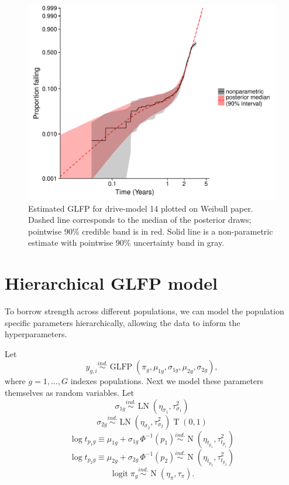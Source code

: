 \documentclass[12pt]{article}
\newcommand{\ind}{\stackrel{ind.}{\sim}}
\newcommand{\op}{\operatorname}
\begin{document}
\begin{figure}[H]
\centering
  \includegraphics[width=.8\textwidth]{mod14_example1.pdf}
  \caption{Estimated GLFP for drive-model 14 plotted on Weibull paper.  Dashed line corresponds to the median of the posterior draws; pointwise 90\% credible band is in red.  Solid line is a non-parametric estimate with pointwise 90\% uncertainty band in gray.}
  \label{fig1}
\end{figure}


\section{Hierarchical GLFP model}
\label{sec:Hierarchical GLFP model}

To borrow strength across different populations, we can model the population specific parameters hierarchically, allowing the data to inform the hyperparameters.

Let
\begin{equation}
y_{g,i} \ind \op{GLFP}\left( \pi_g, \mu_{1g}, \sigma_{1g}, \mu_{2g}, \sigma_{2g} \right),
\end{equation}
where $g=1,\ldots,G$ indexes populations. Next we model these parameters themselves as random variables. Let
\begin{equation*}
\sigma_{1g} \ind \op{LN} \left( \eta_{\sigma_1}, \tau^2_{\sigma_1} \right)
\end{equation*}
\begin{equation*}
\sigma_{2g} \ind \op{LN} \left( \eta_{\sigma_2}, \tau^2_{\sigma_2}\right)\op{T}\left(0, 1\right)
\end{equation*}
\begin{equation}
\label{eq:hier-model}
\log t_{p_{1}g} \equiv \mu_{1g} + \sigma_{1g}\,\Phi^{-1}(p_1)  \ind \op{N} \left(\eta_{t_{p_1}}, \tau^2_{t_{p_1}}\right)
\end{equation}
\begin{equation*}
\log t_{p_{2}g} \equiv \mu_{2g} + \sigma_{2g}\,\Phi^{-1}(p_2)  \ind \op{N} \left(\eta_{t_{p_2}}, \tau^2_{t_{p_2}}\right)
\end{equation*}
\begin{equation*}
\op{logit} \pi_g \ind \op{N}(\eta_\pi, \tau_\pi).
\end{equation*}
\end{document}
